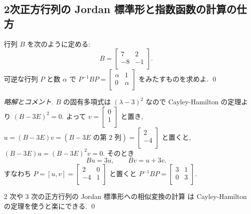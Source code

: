 \documentclass[12pt,twoside]{jarticle}
\newcommand\commentout[1]{#1}
\newcommand\commentout[1]{}
\begin{document}
\subsection{2次正方行列の Jordan 標準形と指数函数の計算の仕方}
\label{sec:2x2-Jordan}


\begin{question}[簡単だが一度はやるべき問題なので10点]
  行列 $B$ を次のように定める:
  \begin{equation*}
    B = 
    \begin{bmatrix}
        7 &  2 \\
       -8 & -1 \\
     \end{bmatrix}.
   \end{equation*}
   可逆な行列 $P$ と数 $\alpha$ で %
   $P^{-1}BP = 
   \begin{bmatrix}
     \alpha & 1 \\
     0 & \alpha \\
   \end{bmatrix}$ をみたすものを求めよ. 
   \qed
\end{question}

\commentout{
\begin{proof}[略解とコメント]
$B$ の固有多項式は $(\lambda-3)^2$ なので 
Cayley-Hamilton の定理より $(B-3E)^2=0$.  
よって $v=
\begin{bmatrix}
  0 \\
  1 \\
\end{bmatrix}$ と置き, $u = (B-3E)v = (\text{$B-3E$ の第 $2$ 列}) = 
\begin{bmatrix}
  2 \\
  -4 \\
\end{bmatrix}$ と置くと, $(B-3E)u=(B-3E)^2v=0$. そのとき
\begin{equation*}
  Bu = 3u, \qquad Bv = u + 3v.
\end{equation*}
すなわち $P = [u,v] = 
\begin{bmatrix}
   2 & 0 \\
  -4 & 1 \\
\end{bmatrix}$ と置くと $P^{-1}BP=
\begin{bmatrix}
  3 & 1 \\
  0 & 3 \\
\end{bmatrix}$.

\medskip\noindent {\bf コメント.} 
$2$ 次や $3$ 次の正方行列の Jordan 標準形への相似変換の計算
は Cayley-Hamilton の定理を使うと楽にできる.
\qed
\end{proof}
}
\end{document}
